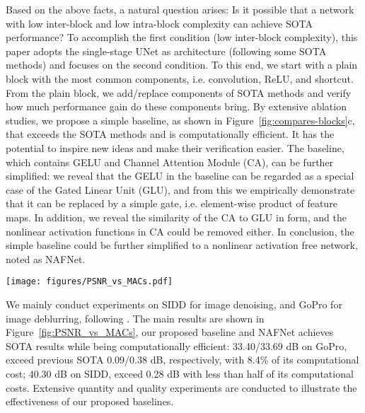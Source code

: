 \documentclass[runningheads]{llncs}
\begin{document}
Based on the above facts, a natural question arises: 
Is it possible that a network with low inter-block and low intra-block complexity can achieve SOTA performance?
To accomplish the first condition (low inter-block complexity), this paper adopts the single-stage UNet as architecture (following some SOTA methods\cite{zamir2021restormer,wang2021uformer}) and focuses on the second condition. 
To this end, we start with a plain block with the most common components, i.e. convolution, ReLU, and shortcut\cite{he2016deep}. From the plain block, we add/replace components of SOTA methods and verify how much performance gain do these components bring. 
By extensive ablation studies, we propose a simple baseline, as shown in Figure~\ref{fig:compares-blocks}c, that exceeds the SOTA methods and is computationally efficient. 
It has the potential to inspire new ideas and make their verification easier. 
The baseline, which contains GELU\cite{hendrycks2016gaussian} and Channel Attention Module\cite{hu2018squeeze} (CA), can be further simplified: we reveal that the GELU in the baseline can be regarded as a special case of the Gated Linear Unit\cite{dauphin2017language} (GLU), and from this we empirically demonstrate that it can be replaced by a simple gate, i.e. element-wise product of feature maps.
In addition, we reveal the similarity of the CA to GLU in form, and the nonlinear activation functions in CA could be removed either. In conclusion, the simple baseline could be further simplified to a nonlinear activation free network, noted as NAFNet.
\begin{figure*}[!t]
\texttt{[image: figures/PSNR\_vs\_MACs.pdf]}
\caption{PSNR vs. computational cost on Image Deblurring (left) and Image Denoising (right) tasks}
\label{fig:PSNR_vs_MACs}
\end{figure*}
We mainly conduct experiments on SIDD\cite{SIDD_2018_CVPR} for image denoising, and  GoPro\cite{nah2017deep} for image deblurring, following \cite{chen2021hinet,zamir2021restormer,waqas2021multi}.
The main results are shown in Figure~\ref{fig:PSNR_vs_MACs}, our proposed baseline and NAFNet achieves SOTA results while being computationally efficient: 33.40/33.69 dB on GoPro, exceed previous SOTA\cite{chu2021revisiting} 0.09/0.38 dB, respectively, with 8.4\% of its computational cost; 40.30 dB on SIDD, exceed \cite{zamir2021restormer} 0.28 dB with less than half of its computational costs. Extensive quantity and quality experiments are conducted to illustrate the effectiveness of our proposed baselines. 
\end{document}
